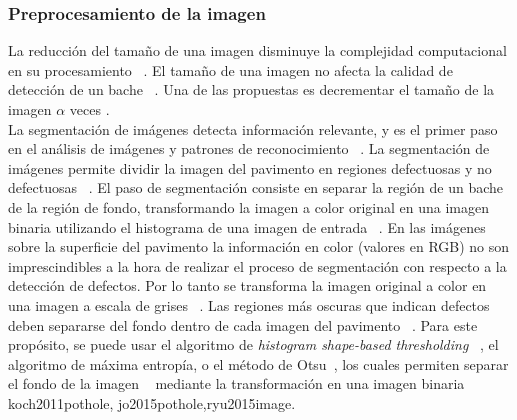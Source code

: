 		\subsubsection{Preprocesamiento de la imagen}
		La reducción del tamaño de una imagen  disminuye la complejidad computacional en su procesamiento ~. 
		El tamaño de una imagen no afecta la calidad de detección de un bache ~. Una de las propuestas 
		es decrementar el tamaño de la imagen $\alpha$ veces . \\
		La segmentación de imágenes detecta información relevante, y es el primer paso en el análisis de imágenes y patrones
		de reconocimiento ~.
		La segmentación de imágenes permite  dividir la imagen del pavimento en regiones defectuosas y no defectuosas ~.
		El paso de segmentación consiste en separar la región de un bache de la región de fondo, transformando la imagen a color original 
		en una imagen binaria utilizando el histograma de una imagen de entrada ~.
		En las imágenes sobre la superficie del pavimento la información en color (valores en RGB) no son imprescindibles a la hora de realizar 
		el proceso de segmentación con respecto a la detección de defectos. Por lo tanto se  transforma la imagen original a color en una 
		imagen a escala de grises  ~. Las regiones más oscuras que indican defectos deben separarse del fondo 
		dentro de cada imagen del pavimento ~. Para este propósito, se puede usar el algoritmo de \emph{histogram shape-based
		thresholding} ~, el algoritmo de máxima entropía, o el método de Otsu~, 
		los cuales permiten separar el fondo de la imagen ~ mediante la transformación en una imagen binaria \brackcite
		{koch2011pothole, jo2015pothole,ryu2015image}. 

